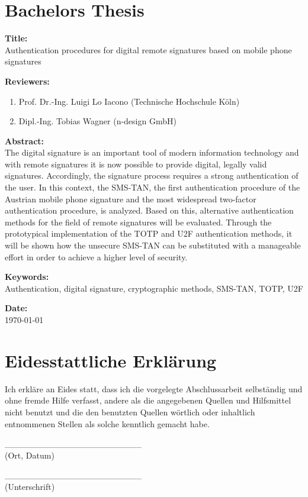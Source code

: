 \chapter*{Bachelors Thesis}
\textbf{Title:} \\
Authentication procedures for digital remote signatures based on mobile phone signatures

\vspace{0.5cm}

\textbf{Reviewers:}
\begin{enumerate}
    \item Prof. Dr.-Ing. Luigi Lo Iacono (Technische Hochschule Köln)
    \item Dipl.-Ing. Tobias Wagner (n-design GmbH)
\end{enumerate}

\vspace{0.5cm}

\textbf{Abstract:} \\
The digital signature is an important tool of modern information technology and with remote signatures it is now possible to provide digital, legally valid signatures. Accordingly, the signature process requires a strong authentication of the user. In this context, the SMS-TAN, the first authentication procedure of the Austrian mobile phone signature and the most widespread two-factor authentication procedure, is analyzed. Based on this, alternative authentication methods for the field of remote signatures will be evaluated. Through the prototypical implementation of the TOTP and U2F authentication methods, it will be shown how the unsecure SMS-TAN can be substituted with a manageable effort in order to achieve a higher level of security.

\vspace{0.5cm}

\textbf{Keywords:} \\
Authentication, digital signature, cryptographic methods, SMS-TAN, TOTP, U2F

\vspace{0.5cm}

\textbf{Date:} \\
\today

\clearpage

\chapter*{Eidesstattliche Erklärung}
Ich erkläre an Eides statt, dass ich die vorgelegte Abschlussarbeit selbständig und ohne fremde Hilfe verfasst, andere als die angegebenen Quellen und Hilfsmittel nicht benutzt und die den benutzten Quellen wörtlich oder inhaltlich entnommenen Stellen als solche kenntlich gemacht habe.

\vspace{1.5cm}

\_\_\_\_\_\_\_\_\_\_\_\_\_\_\_\_\_\_\_\_\_\_ \\
(Ort, Datum)

\vspace{1.0cm}

\_\_\_\_\_\_\_\_\_\_\_\_\_\_\_\_\_\_\_\_\_\_ \\
(Unterschrift)

\clearpage
